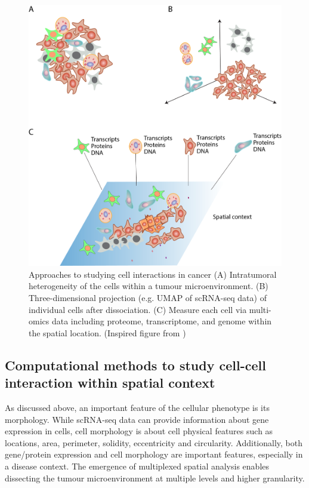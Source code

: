 \begin{figure}[hbt]
    \centering
    \includegraphics[width=0.7\columnwidth]{Chapter1/Figures/Chap1_Figure5.png}
    \caption{Approaches to studying cell interactions in cancer (A) Intratumoral heterogeneity of the cells within a tumour microenvironment. (B) Three-dimensional projection (e.g. UMAP of scRNA-seq data) of individual cells after dissociation. (C) Measure each cell via multi-omics data including proteome, transcriptome, and genome within the spatial location. (Inspired figure from \cite{de2020unraveling})}
    \label{fig:multimodal_approach_cci}
\end{figure}

\subsection{Computational methods to study cell-cell interaction within spatial context}
\label{Chap1:Sub_Computational} 

As discussed above, an important feature of the cellular phenotype is its morphology. While scRNA-seq data can provide information about gene expression in cells, cell morphology is about cell physical features such as locations, area, perimeter, solidity, eccentricity and circularity. Additionally, both gene/protein expression and cell morphology are important features, especially in a disease context. The emergence of multiplexed spatial analysis enables dissecting the tumour microenvironment at multiple levels and higher granularity. 


